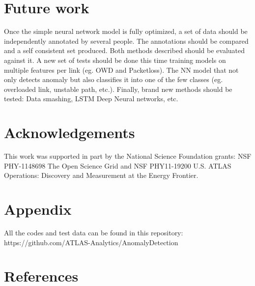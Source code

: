 \documentclass[5p]{elsarticle}
\begin{document}
\section{Future work}
Once the simple neural network model is fully optimized, a set of data should be independently annotated by several people. The annotations should be compared and a self consistent set produced. Both methods described should be evaluated against it.  A new set of tests should be done this time training models on multiple features per link (eg. OWD and Packetloss). The NN model that not only detects anomaly but also classifies it into one of the few classes (eg. overloaded link, unstable path, etc.). Finally, brand new methods should be tested: Data smashing\cite{twelve}, LSTM Deep Neural networks, etc.   

\section{Acknowledgements}

This work was supported in part by the National Science Foundation grants: NSF PHY-1148698 The Open Science Grid and NSF PHY11-19200 U.S. ATLAS Operations: Discovery and Measurement at the Energy Frontier.

\section{Appendix}

All the codes and test data can be found in this repository:\\
https://github.com/ATLAS-Analytics/AnomalyDetection

\section*{References}



\end{document}
